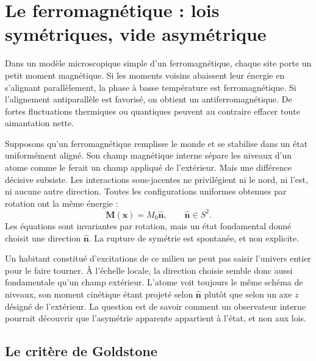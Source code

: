 \section{Le ferromagnétique : lois symétriques, vide asymétrique}

Dans un modèle microscopique simple d’un ferromagnétique, chaque site porte un petit moment magnétique. Si les moments voisins abaissent leur énergie en s’alignant parallèlement, la phase à basse température est ferromagnétique. Si l’alignement antiparallèle est favorisé, on obtient un antiferromagnétique. De fortes fluctuations thermiques ou quantiques peuvent au contraire effacer toute aimantation nette.

Supposons qu’un ferromagnétique remplisse le monde et se stabilise dans un état uniformément aligné. Son champ magnétique interne sépare les niveaux d’un atome comme le ferait un champ appliqué de l’extérieur. Mais une différence décisive subsiste. Les interactions sous-jacentes ne privilégient ni le nord, ni l’est, ni aucune autre direction. Toutes les configurations uniformes obtenues par rotation ont la même énergie :
\begin{equation}
\mathbf M(\mathbf x)=M_0\hat{\mathbf n},
\qquad
\hat{\mathbf n}\in S^2.
\label{eq:l9-ferromagnetic-vacua}
\end{equation}
Les équations sont invariantes par rotation, mais un état fondamental donné choisit une direction \(\hat{\mathbf n}\). La rupture de symétrie est spontanée, et non explicite.

Un habitant constitué d’excitations de ce milieu ne peut pas saisir l’univers entier pour le faire tourner. À l’échelle locale, la direction choisie semble donc aussi fondamentale qu’un champ extérieur. L’atome voit toujours le même schéma de niveaux, son moment cinétique étant projeté selon \(\hat{\mathbf n}\) plutôt que selon un axe \(z\) désigné de l’extérieur. La question est de savoir comment un observateur interne pourrait découvrir que l’asymétrie apparente appartient à l’état, et non aux lois.

\subsection{Le critère de Goldstone}

